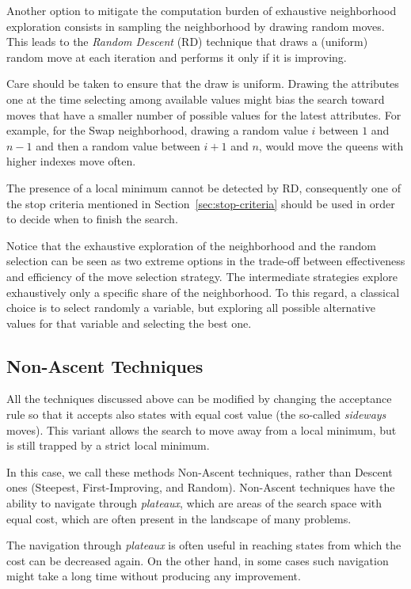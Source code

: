 Another option to mitigate the computation burden of exhaustive neighborhood exploration 
consists in sampling the neighborhood by drawing random moves. This leads to
the \emph{Random Descent} (RD) technique that draws a (uniform) random move
at each iteration and performs it only if it is improving. 

Care should be taken to ensure that the draw is uniform. Drawing the attributes one at 
the time selecting among available values might bias the search toward moves 
that have a smaller number of possible values for the latest attributes.
For example, for the \textsf{Swap} neighborhood, drawing a random value $i$ between $1$ and 
$n-1$ and then a random value between $i+1$ and $n$, would move the queens with higher indexes move often.


The presence of a local minimum cannot be detected by RD, consequently one of
the stop criteria mentioned in Section~\ref{sec:stop-criteria} should
be used in order to decide when to finish the search.

Notice that the exhaustive exploration of the neighborhood and the random
selection can be seen as two extreme options in the trade-off between
effectiveness and efficiency of the move selection strategy. The
intermediate strategies explore exhaustively only a specific share of the
neighborhood. To this regard, a classical choice is to select randomly
a variable, but exploring all possible alternative values for that
variable and selecting the best one.


\subsection{Non-Ascent Techniques}

All the techniques discussed above can be modified by changing the
acceptance rule so that it accepts also states with equal cost value (the
so-called \emph{sideways} moves). This variant allows the search to move away
from a local minimum, but is still trapped by a strict local minimum.

In this case, we call these methods Non-Ascent techniques, rather than Descent
ones (Steepest, First-Improving, and Random). Non-Ascent
techniques have the ability to navigate through \emph{plateaux},
which are areas of the search space with equal cost, which are often
present in the landscape of many problems.

The navigation through \emph{plateaux} is often useful in reaching states from which the cost can be decreased again. On the other hand, in some cases such navigation might take a long time without producing any improvement.

